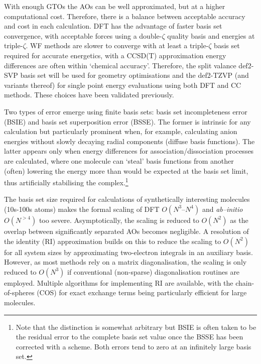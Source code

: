 \documentclass[main.tex]{subfiles}
\begin{document}
With enough GTOs the AOs can be well approximated, but at a higher computational cost. Therefore, there is a balance between acceptable accuracy and cost in each calculation. DFT has the advantage of faster basis set convergence,\cite{Jan1995} with acceptable forces using a double-$\zeta$ quality basis and energies at triple-$\zeta$.\cite{Sure2015chemopen} WF methods are slower to converge with at least a triple-$\zeta$ basis set required for accurate energetics, with a CCSD(T) approximation energy differences are often within `chemical accuracy'.\cite{Zhang2012} Therefore, the split valance def2-SVP basis set will be used for geometry optimisations and the def2-TZVP (and variants thereof) for single point energy evaluations using both DFT and CC methods. These choices have been validated previously.\cite{Kirschner2020}

Two types of error emerge using finite basis sets: basis set incompleteness error (BSIE) and basis set superposition error (BSSE). The former is intrinsic for any calculation but particularly prominent when, for example, calculating anion energies without slowly decaying radial components (diffuse basis functions). The latter appears only when energy differences for association/dissociation processes are calculated, where one molecule can `steal' basis functions from  another (often) lowering the energy more than would be expected at the basis set limit, thus artificially stabilising the complex.\footnote{Note that the distinction is somewhat arbitrary but BSIE is often taken to be the residual error to the complete basis set value once the BSSE has been corrected with a scheme. Both errors tend to zero at an infinitely large basis set.}\cite{BSSE1999}

The basis set size required for calculations of synthetically interesting molecules (10s-100s atoms) makes the formal scaling of DFT $O(N^3\mbox{--}N^4)$ and \emph{ab--initio} $O(N^{>4})$ too severe. Asymptotically, the scaling is reduced to $O(N^2)$ as the overlap between significantly separated AOs becomes negligible.\cite{Dyczmons1973} A resolution of the identity (RI) approximation builds on this to reduce the scaling to $O(N^2)$ for all system sizes by approximating two-electron integrals in an auxiliary basis.\cite{Hser1989} However, as most methods rely on a matrix diagonalisation, the scaling is only reduced to $O(N^3)$ if conventional (non-sparse) diagonalisation routines are employed. Multiple algorithms for implementing RI are available, with the chain-of-spheres (COS) for exact exchange terms being particularly efficient for large molecules.\cite{Neese2009}
\end{document}
